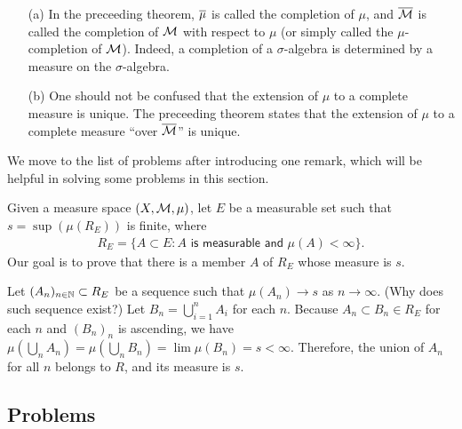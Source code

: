 \begin{rmk}
    \begin{enumerate}
        \item[(a)]
        {
            In the preceeding theorem, $\overline{\mu}$ is called the completion of $\mu$, and $\overline{{\mathcal{M}}}$ is called the completion of ${\mathcal{M}}$ with respect to $\mu$ (or simply called the $\mu$-completion of ${\mathcal{M}}$).
            Indeed, a completion of a $\sigma$-algebra is determined by a measure on the $\sigma$-algebra.
        }
        \item[(b)]
        {
            One should not be confused that the extension of $\mu$ to a complete measure is unique.
            The preceeding theorem states that the extension of $\mu$ to a complete measure ``over $\overline{{\mathcal{M}}}$'' is unique.
        }
    \end{enumerate}
\end{rmk}

We move to the list of problems after introducing one remark, which will be helpful in solving some problems in this section.
\begin{obs}\label{maximal measurable subset of finite measure}
    Given a measure space $(X, {\mathcal{M}}, \mu)$, let $E$ be a measurable set such that $s=\sup\left(\mu(R_E)\right)$ is finite, where
    \begin{align*}
        R_E=\{
            A\subset E:
            \textsf{$A$ is measurable and $\mu(A)<\infty$}
        \}.
    \end{align*}
    Our goal is to prove that there is a member $A$ of $R_E$ whose measure is $s$.

    Let $(A_n)_{n\in{\mathbb{N}}}\subset R_E$ be a sequence such that $\mu(A_n)\rightarrow s$ as $n\rightarrow\infty$. \color{brown}(Why does such sequence exist?) \color{black}
    Let $B_n=\bigcup_{i=1}^n A_i$ for each $n$.
    Because $A_n\subset B_n\in R_E$ for each $n$ and $(B_n)_n$ is ascending, we have $\mu\left(\bigcup_n A_n\right)=\mu\left(\bigcup_n B_n\right)=\lim\mu(B_n)=s<\infty$.
    Therefore, the union of $A_n$ for all $n$ belongs to $R$, and its measure is $s$.
\end{obs}

\subsection*{Problems}

